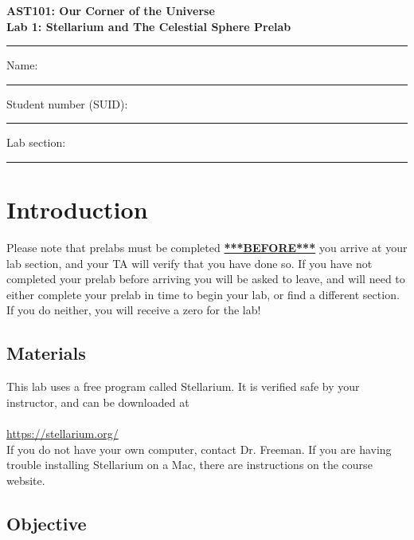 \documentclass[11pt]{article}
\begin{document}
\begin{center}
\textbf{\Large
AST101: Our Corner of the Universe \\
\vspace*{0.1cm}
Lab 1: Stellarium and The Celestial Sphere Prelab
}
\end{center}

\vspace*{0.5cm}

\hrule
{\Large Name:}\vspace*{0.5cm}\\\hrule
{\Large Student number (SUID):}\vspace*{0.5cm}\\\hrule
{\Large Lab section:}\vspace*{0.5cm}\\\hrule
\vspace*{0.5cm}

\section{Introduction}

Please note that prelabs must be completed \underline{\textbf{***BEFORE***}} you arrive at your lab section, and your TA will verify that you have done so. If you have not completed your prelab before arriving you will be asked to leave, and will need to either complete your prelab in time to begin your lab, or find a different section. If you do neither, you will receive a zero for the lab!

\subsection*{Materials}

This lab uses a free program called Stellarium. It is verified safe by your instructor, and can be downloaded at  \\
\\
\url{https://stellarium.org/} \\

If you do not have your own computer, contact Dr. Freeman. If you are having trouble installing Stellarium on a Mac, there 
are instructions on the course website.

\subsection*{Objective}
\end{document}
